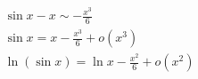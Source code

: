 \begin{align*}
 &\sin x - x \sim -\frac{x^3}{6} \\
 &\sin x = x -\frac{x^3}{6} +o(x^3)\\
 &\ln(\sin x) = \ln x -\frac{x^2}{6} +o(x^2)
\end{align*}
